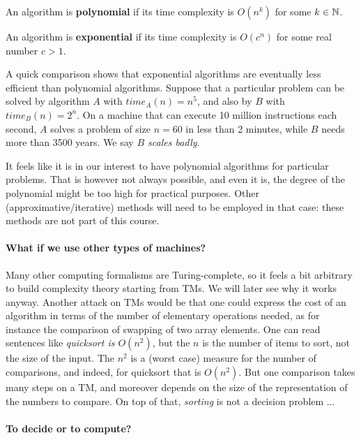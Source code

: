 \begin{definition}
An algorithm is {\bf polynomial} if its time complexity is $O(n^k)$
for some $k\in \mathbb{N}$.
\end{definition}

\begin{definition}
An algorithm is {\bf exponential} if its time complexity is
$O(c^n)$ for some real number $c>1$.
\end{definition}

A quick comparison shows that exponential algorithms are eventually
less efficient than polynomial algorithms. Suppose that a particular
problem can be solved by algorithm $A$ with $time_A(n)=n^5$, and also
by $B$ with $time_B(n)=2^n$. On a machine that can execute 10 million
instructions each second, $A$ solves a problem of size $n=60$ in
less than 2 minutes, while $B$ needs more than 3500 years. We say {\em
$B$ scales badly}.

It feels like it is in our interest to have polynomial algorithms for
particular problems. That is however not always possible, and even it
is, the degree of the polynomial might be too high for practical
purposes. Other (approximative/iterative) methods will need to be employed in that case: these
methods are not part of this course.



\paragraph{What if we use other types of machines?} Many other
computing formalisms are Turing-complete, so it feels a bit arbitrary
to build complexity theory starting from TMs. We will later see why it
works anyway. Another attack on TMs would be that one could express
the cost of an algorithm in terms of the number of elementary
operations needed, as for instance the comparison of swapping of two
array elements. One can read sentences like {\em quicksort is
$O(n^2)$}, but the $n$ is the number of items to sort, not the size of
the input. The $n^2$ is a (worst case) measure for the number of
comparisons, and indeed, for quicksort that is $O(n^2)$. But one
comparison takes many steps on a TM, and moreover depends on the size
of the representation of the numbers to compare. On top of that, {\em
sorting} is not a decision problem ...


\paragraph{To decide or to compute?}

